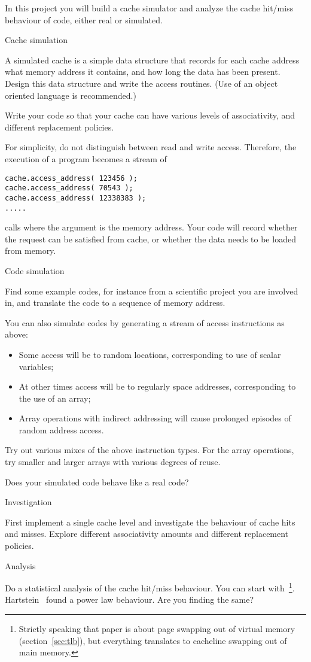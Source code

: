 In this project you will build a cache simulator and analyze the cache
hit/miss behaviour of code, either real or simulated.

 {Cache simulation}

A simulated cache is a simple data structure that records for each
cache address what memory address it contains, and how long the data
has been present. Design this data structure and write the access
routines. (Use of an object oriented language is recommended.)

Write your code so that your cache can have various levels of
associativity, and different replacement policies.

For simplicity, do not distinguish between read and write
access. Therefore, the execution of a program becomes a stream of
\begin{verbatim}
cache.access_address( 123456 );
cache.access_address( 70543 );
cache.access_address( 12338383 );
.....
\end{verbatim}
calls where the argument is the memory address. Your code will record
whether the request can be satisfied from cache, or whether the data
needs to be loaded from memory.

 {Code simulation}

Find some example codes, for instance from a scientific project you
are involved in, and translate the code to a sequence of memory
address. 

You can also simulate codes by generating a stream of access
instructions as above:
\begin{itemize}
\item Some access will be to random locations, corresponding to use of
  scalar variables;
\item At other times access will be to regularly space addresses,
  corresponding to the use of an array;
\item Array operations with indirect addressing will cause prolonged
  episodes of random address access.
\end{itemize}
Try out various mixes of the above instruction types. For the array
operations, try smaller and larger arrays with various degrees of
reuse.

Does your simulated code behave like a real code?

 {Investigation}

First implement a single cache level and investigate the behaviour of
cache hits and misses. Explore different associativity amounts and
different replacement policies.

 {Analysis}

Do a statistical analysis of the cache hit/miss behaviour. You can
start with~\cite{Rao:1978:cache}\footnote{Strictly speaking that paper
  is about page swapping out of virtual memory
  (section~\ref{sec:tlb}), but everything translates to cacheline
  swapping out of main memory.}. Hartstein~\cite{Hartstein:cache-sqrt}
found a power law behaviour. Are you finding the same?
